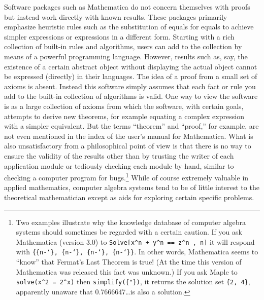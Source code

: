 Software packages such as Mathematica \cite{Wolfram} do not
concern themselves with proofs but instead work directly with known results.
These packages primarily emphasize heuristic rules such as the substitution of
equals for equals to achieve simpler expressions or expressions in a different
form.  Starting with a rich collection of built-in rules and algorithms, users
can add to the collection by means of a powerful programming language.
However, results such as, say, the existence of a certain abstract object
without displaying the actual object cannot be expressed (directly) in their
languages.  The idea of a proof from a small set of axioms is absent.  Instead
this software simply assumes that each fact or rule you add to the built-in
collection of algorithms is valid.  One way to view the software is as a large
collection of axioms from which the software, with certain goals, attempts to
derive new theorems, for example equating a complex expression with a simpler
equivalent. But the terms ``theorem'' and
``proof,'' for example, are not even mentioned in the index of
the user's manual for Mathematica.  What is also
unsatisfactory from a philosophical point of view is that there is no way to
ensure the validity of the results other than by trusting the writer of each
application module or tediously checking each module by hand, similar to
checking a computer program for bugs.\footnote{Two examples illustrate why the knowledge database of computer
algebra systems should sometimes be regarded with a certain caution.  If you
ask Mathematica (version 3.0) to \texttt{Solve[x\^{ }n + y\^{ }n == z\^{ }n , n]}
it will respond with \texttt{\{\{n-\char`\}, \{n-\char`\},
\{n-\char`\}, \{n-\char`\}\}}. In other words, Mathematica seems to
``know'' that Fermat's Last Theorem is true!  (At
the time this version of Mathematica was released this fact was unknown.)  If
you ask Maple to \texttt{solve(x\^{ }2 = 2\^{ }x)} then
\texttt{simplify(\{"\})}, it returns the solution set \texttt{\{2, 4\}}, apparently
unaware that 0.7666647\ldots is also a solution.} While of course extremely
valuable in applied mathematics, computer algebra systems tend to be of little
interest to the theoretical mathematician except as aids for exploring certain
specific problems.


